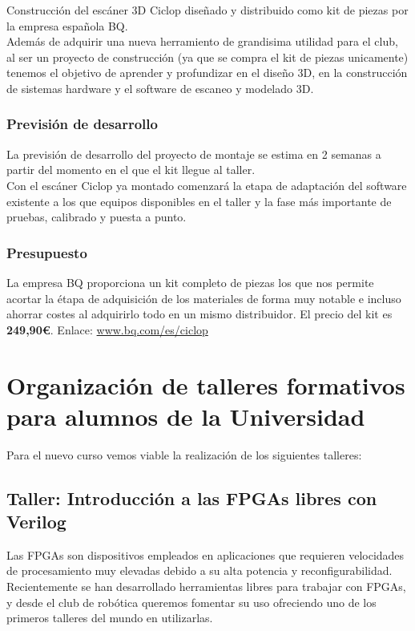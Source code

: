 \documentclass[12pt,twoside]{report}
\begin{document}
Construcción del escáner 3D Ciclop diseñado y distribuido como kit de piezas por la empresa española BQ.\\
Además de adquirir una nueva herramiento de grandisima utilidad para el club, al ser un proyecto de construcción (ya que se compra el kit de piezas unicamente) tenemos el objetivo de aprender y profundizar en el diseño 3D, en la construcción de sistemas hardware y el software de escaneo y modelado 3D.

\subsubsection{Previsión de desarrollo}
La previsión de desarrollo del proyecto de montaje se estima en 2 semanas a partir del momento en el que el kit llegue al taller.\\
Con el escáner Ciclop ya montado comenzará la etapa de adaptación del software existente a los que equipos disponibles en el taller y la fase más importante de pruebas, calibrado y puesta a punto.
\subsubsection{Presupuesto}
La empresa BQ proporciona un kit completo de piezas los que nos permite acortar la étapa de adquisición de los materiales de forma muy notable e incluso ahorrar costes al adquirirlo todo en un mismo distribuidor.
El precio del kit es {\bf 249,90\euro{}}.
Enlace: \url{www.bq.com/es/ciclop}









\section{Organización de talleres formativos para alumnos de la Universidad}

Para el nuevo curso vemos viable la realización de los siguientes talleres:


\subsection{Taller: Introducción a las FPGAs libres con Verilog}
Las FPGAs son dispositivos empleados en aplicaciones que requieren velocidades de procesamiento muy elevadas debido a su alta potencia y reconfigurabilidad.
Recientemente se han desarrollado herramientas libres para trabajar con FPGAs, y desde el club de robótica queremos fomentar su uso ofreciendo uno de los primeros talleres del mundo en utilizarlas.
\end{document}
